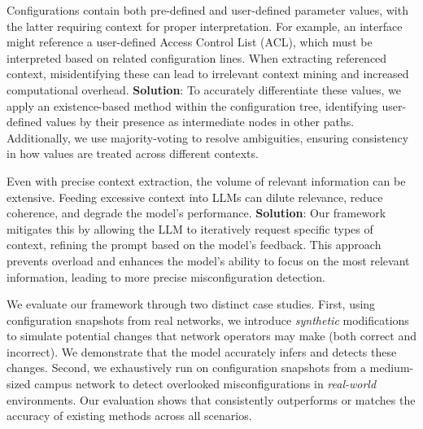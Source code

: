 Configurations contain both pre-defined and user-defined parameter values, with the latter requiring context for proper interpretation. For example, an interface might reference a user-defined Access Control List (ACL), which must be interpreted based on related configuration lines. When extracting referenced context, misidentifying these can lead to irrelevant context mining and increased computational overhead. \textbf{Solution}: To accurately differentiate these values, we apply an existence-based method within the configuration tree, identifying user-defined values by their presence as intermediate nodes in other paths. Additionally, we use majority-voting to resolve ambiguities, ensuring consistency in how values are treated across different contexts.

Even with precise context extraction, the volume of relevant information can be extensive. 
Feeding excessive context into LLMs can dilute relevance, reduce coherence, and degrade the model’s performance.
\textbf{Solution}: Our framework mitigates this by allowing the LLM to iteratively request specific types of context, refining the prompt based on the model’s feedback. This approach prevents overload and enhances the model’s ability to focus on the most relevant information, leading to more precise misconfiguration detection.

We evaluate our framework through two distinct case studies.
First, using configuration snapshots from real networks, we introduce {\em synthetic} modifications to simulate potential changes that network operators may make (both correct and incorrect). We demonstrate that the model accurately infers and detects these changes. 
Second, we exhaustively run \sysname{} on configuration snapshots from a medium-sized campus network to detect overlooked misconfigurations in {\em real-world} environments. Our evaluation shows that \sysname{} consistently outperforms or matches the accuracy of existing methods across all scenarios.